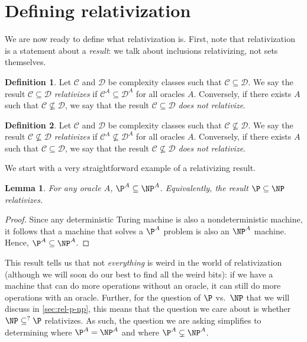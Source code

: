 \documentclass[english,12pt]{reedthesis}
\theoremstyle{plain}
\newtheorem{lemma}[lemma]{Lemma}
\theoremstyle{definition}
\newtheorem{defn}[defn]{Definition}
\theoremstyle{remark}
\begin{document}
\section{Defining relativization}

We are now ready to define what relativization is. First, note that
relativization is a statement about a \emph{result}: we talk about inclusions
relativizing, not sets themselves.

\begin{defn}\label{def:relativization}
  Let $\mathcal{C}$ and $\mathcal{D}$ be complexity classes such that $\mathcal{C} \subseteq \mathcal{D}$. We say the result
  $\mathcal{C} \subseteq \mathcal{D}$ \emph{relativizes} if $\mathcal{C}^{A} \subseteq \mathcal{D}^{A}$ for all oracles $A$. Conversely,
  if there exists $A$ such that $\mathcal{C} \nsubseteq \mathcal{D}$, we say that the result $\mathcal{C} \subseteq \mathcal{D}$
  \emph{does not relativize}.
\end{defn}

\begin{defn}\label{def:relativization-ne}
  Let $\mathcal{C}$ and $\mathcal{D}$ be complexity classes such that $\mathcal{C} \nsubseteq \mathcal{D}$. We say the result
  $\mathcal{C} \nsubseteq \mathcal{D}$ \emph{relativizes} if $\mathcal{C}^{A} \nsubseteq \mathcal{D}^{A}$ for all oracles $A$. Conversely,
  if there exists $A$ such that $\mathcal{C} \subseteq \mathcal{D}$, we say that the result $\mathcal{C} \nsubseteq \mathcal{D}$
  \emph{does not relativize}.
\end{defn}

We start with a very straightforward example of a relativizing result.

\begin{lemma}\label{lem:pa-subset-npa}
  For any oracle $A$, $\P^{A} \subseteq \NP^{A}$. Equivalently, the result $\P \subseteq \NP$
  relativizes.
\end{lemma}

\begin{proof}
  Since any deterministic Turing machine is also a nondeterministic machine, it
  follows that a machine that solves a $\P^{A}$ problem is also an $\NP^{A}$
  machine. Hence, $\P^{A} \subseteq \NP^{A}$.
\end{proof}

This result tells us that not \emph{everything} is weird in the world of
relativization (although we will soon do our best to find all the weird bits):
if we have a machine that can do more operations without an oracle, it can still
do more operations with an oracle. Further, for the question of $\P$ vs.\ $\NP$
that we will discuss in \cref{sec:rel-p-np}, this means that the question we
care about is whether $\NP \subseteq^{?} \P$ relativizes. As such, the question we are
asking simplifies to determining where $\P^{A} = \NP^{A}$ and where
$\P^{A} \subsetneq \NP^{A}$.
\end{document}
